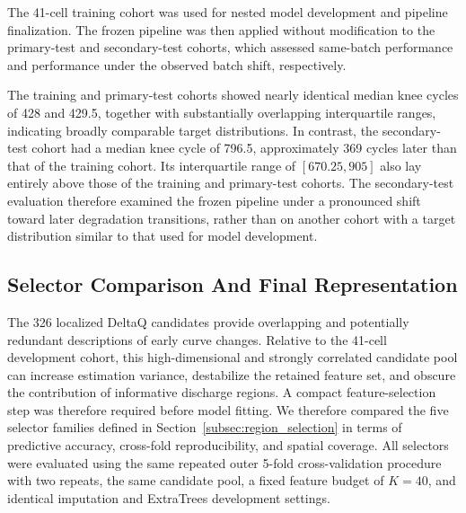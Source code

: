 \documentclass[pdflatex,sn-mathphys-num]{sn-jnl}
\begin{document}
The 41-cell training cohort was used for nested model development and pipeline finalization. The frozen pipeline was then applied without modification to the primary-test and secondary-test cohorts, which assessed same-batch performance and performance under the observed batch shift, respectively. 

The training and primary-test cohorts showed nearly identical median knee cycles of 428 and 429.5, together with substantially overlapping interquartile ranges, indicating broadly comparable target distributions. In contrast, the secondary-test cohort had a median knee cycle of 796.5, approximately 369 cycles later than that of the training cohort. Its interquartile range of $[670.25,905]$ also lay entirely above those of the training and primary-test cohorts. The secondary-test evaluation therefore examined the frozen pipeline under a pronounced shift toward later degradation transitions, rather than on another cohort with a target distribution similar to that used for model development.

\subsection{Selector Comparison And Final Representation}
\label{subsec:main_results}

The 326 localized DeltaQ candidates provide overlapping and potentially redundant descriptions of early curve changes. Relative to the 41-cell development cohort, this high-dimensional and strongly correlated candidate pool can increase estimation variance, destabilize the retained feature set, and obscure the contribution of informative discharge regions. A compact feature-selection step was therefore required before model fitting. We therefore compared the five selector families defined in Section~\ref{subsec:region_selection} in terms of predictive accuracy, cross-fold reproducibility, and spatial coverage. All selectors were evaluated using the same repeated outer 5-fold cross-validation procedure with two repeats, the same candidate pool, a fixed feature budget of $K=40$, and identical imputation and ExtraTrees development settings.
\end{document}
